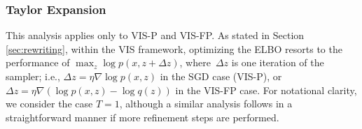 \subsubsection*{Taylor Expansion}\label{sec:taylor}

This analysis applies only to VIS-P and VIS-FP.
As stated in Section \ref{sec:rewriting},  within the VIS framework, optimizing the ELBO resorts to the performance of $\max_z \log p(x, z + \Delta z)$, where~$\Delta z$ is one iteration of the sampler; i.e., $\Delta z = \eta \nabla \log p(x, z)$ in the SGD case (VIS-P), \linebreak or  $\Delta z = \eta \nabla (\log p(x, z) - \log q(z))$ in the VIS-FP case. %
For notational clarity, we consider the case $T=1$, 
although a similar analysis
follows in a straightforward manner if more refinement steps are performed.

